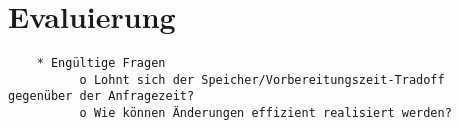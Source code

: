 \chapter{Evaluierung}

\begin{verbatim}
    * Engültige Fragen
          o Lohnt sich der Speicher/Vorbereitungszeit-Tradoff gegenüber der Anfragezeit?
          o Wie können Änderungen effizient realisiert werden? 
\end{verbatim}
